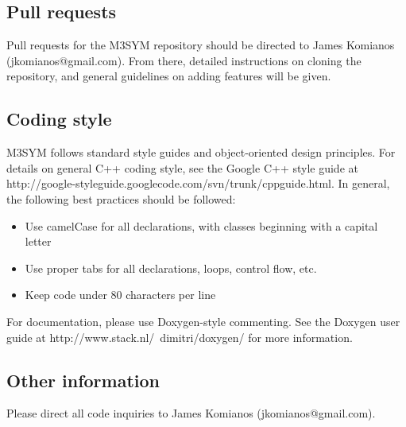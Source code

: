 \documentclass[11pt, oneside]{article}   	%
\begin{document}
\subsection{Pull requests}

Pull requests for the M3SYM repository should be directed to James Komianos (jkomianos@gmail.com). From there, detailed instructions on cloning the repository, and general guidelines on adding features will be given.

\subsection{Coding style}

M3SYM follows standard style guides and object-oriented design principles. For details on general C++ coding style, see the Google C++ style guide at http://google-styleguide.googlecode.com/svn/trunk/cppguide.html. In general, the following best practices should be followed:

\begin{itemize}

\item Use camelCase for all declarations, with classes beginning with a capital letter
\item Use proper tabs for all declarations, loops, control flow, etc.
\item Keep code under 80 characters per line

\end{itemize}

\noindent For documentation, please use Doxygen-style commenting. See the Doxygen user guide at 
http://www.stack.nl/~dimitri/doxygen/ for more information.

\subsection{Other information}

Please direct all code inquiries to James Komianos (jkomianos@gmail.com).
\end{document}
